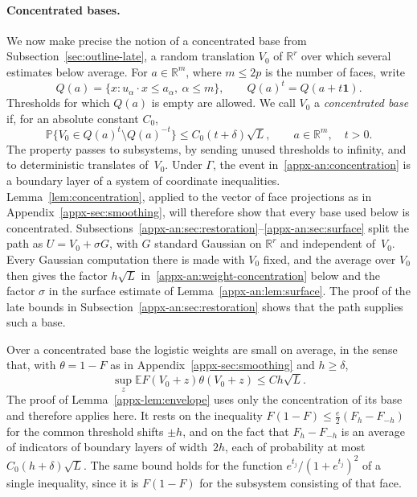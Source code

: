 \documentclass[11pt,letterpaper]{article}
\newif\ifshowrev
\newenvironment{revblock}{\ifshowrev\color{revblue}%
\hypersetup{linkcolor=revblue,citecolor=revblue,urlcolor=revblue}\fi}{}
\newif\ifshowtrim
\newcommand{\trim}[1]{\ifshowtrim{\color{revblue}%
\hypersetup{linkcolor=revblue,citecolor=revblue,urlcolor=revblue}#1}\else#1\fi}
\newif\ifshowskill
\newcommand{\skl}[1]{\ifshowskill{\color{revblue}%
\hypersetup{linkcolor=revblue,citecolor=revblue,urlcolor=revblue}#1}\else#1\fi}
\theoremstyle{remark}
\newcommand{\E}{\mathbb E}
\newcommand{\Pp}{\mathbb P}
\newcommand{\R}{\mathbb R}
\begin{document}
\begin{revblock}
\paragraph{Concentrated bases.}
\trim{We now make precise the notion of a concentrated base from
Subsection~\ref{sec:outline-late}, a random translation \(V_0\) of
\(\R^r\) over which several estimates below average.} For \(a\in\R^m\), where \(m\le2p\) is the number of faces, write
\[
 Q(a)=\{x:u_\alpha\cdot x\le a_\alpha,\ \alpha\le m\},
 \qquad Q(a)^t=Q(a+t\mathbf1).
\]
\trim{Thresholds for which \(Q(a)\) is empty} are allowed. We call \(V_0\) a
\emph{concentrated base} if, for an absolute constant \(C_0\),
\begin{equation}
 \Pp\{V_0\in Q(a)^t\setminus Q(a)^{-t}\}
 \le C_0(t+\delta)\sqrt L,
 \qquad a\in\R^m,\quad t>0.
 \label{appx-an:concentration}
\end{equation}
The property passes to subsystems, by sending unused thresholds to
infinity, and to deterministic translates of~\(V_0\). Under \(\Gamma\),
the event in~\eqref{appx-an:concentration} is a boundary \skl{layer} of a system
of coordinate inequalities. Lemma~\ref{lem:concentration}, applied
to the \trim{vector of face projections} as in Appendix~\ref{appx-sec:smoothing}, will
therefore show that every base used below is concentrated.
\trim{Subsections~\ref{appx-an:sec:restoration}--\ref{appx-an:sec:surface}
split the path as \(U=V_0+\sigma G\), with \(G\) standard Gaussian on
\(\R^r\) and independent of~\(V_0\). Every Gaussian computation there is
made with \(V_0\) fixed, and the average over \(V_0\) then gives the
factor \(h\sqrt L\) in~\eqref{appx-an:weight-concentration} below and
the factor \(\sigma\) in the surface estimate of
Lemma~\ref{appx-an:lem:surface}. The proof of the late bounds in
Subsection~\ref{appx-an:sec:restoration} shows that the path supplies
such a base.}

Over a concentrated base the logistic weights are small on average, in
the sense that, with \(\theta=1-F\) as in
Appendix~\ref{appx-sec:smoothing} and \(h\ge\delta\),
\begin{equation}
 \sup_z\E F(V_0+z)\theta(V_0+z)\le Ch\sqrt L.
 \label{appx-an:weight-concentration}
\end{equation}
The proof of Lemma~\ref{appx-lem:envelope} uses only the concentration
of its base and therefore applies here. It rests on the inequality
\(F(1-F)\le\frac e2(F_h-F_{-h})\) for the common threshold shifts
\(\pm h\), and on the fact that \(F_h-F_{-h}\) is an average of
indicators of \skl{boundary layers} of width~\(2h\), each of probability at most
\(C_0(h+\delta)\sqrt L\). The same bound holds for the function
\(e^{t_j}/(1+e^{t_j})^2\) of a single inequality, since it is \(F(1-F)\)
for the subsystem consisting of that face.


\end{revblock}
\end{document}
